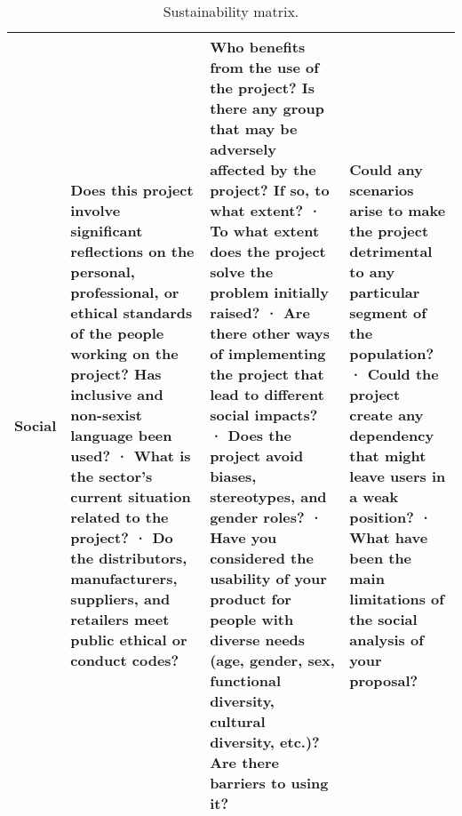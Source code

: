 \begin{landscape}
\begin{table}[htbp!]
\begin{tabular}{@{}lm{6.5cm}m{7cm}m{5.5cm}@{}}
            \bfseries Social & Does this project involve significant reflections on the personal, professional, or ethical standards of the people working on the project? Has inclusive and non-sexist language been used? · What is the sector's current situation related to the project? · Do the distributors, manufacturers, suppliers, and retailers meet public ethical or conduct codes? & Who benefits from the use of the project? Is there any group that may be adversely affected by the project? If so, to what extent? · To what extent does the project solve the problem initially raised? · Are there other ways of implementing the project that lead to different social impacts? · Does the project avoid biases, stereotypes, and gender roles? · Have you considered the usability of your product for people with diverse needs (age, gender, sex, functional diversity, cultural diversity, etc.)? Are there barriers to using it? & Could any scenarios arise to make the project detrimental to any particular segment of the population? · Could the project create any dependency that might leave users in a weak position? · What have been the main limitations of the social analysis of your proposal?\\
            \bottomrule
        \end{tabular}
        \caption{Sustainability matrix.}
        \label{tab:seia}
    \end{table}
\end{landscape}